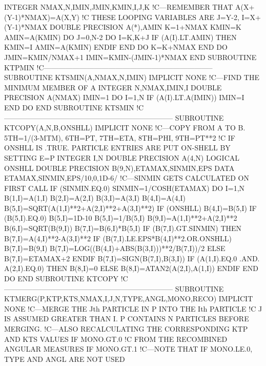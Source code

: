       INTEGER NMAX,N,IMIN,JMIN,KMIN,I,J,K
!C---REMEMBER THAT A(X+(Y-1)*NMAX)=A(X,Y)
!C   THESE LOOPING VARIABLES ARE J=Y-2, I=X+(Y-1)*NMAX
      DOUBLE PRECISION A(*),AMIN
      K=1+NMAX
      KMIN=K
      AMIN=A(KMIN)
      DO J=0,N-2
         DO I=K,K+J
            IF (A(I).LT.AMIN) THEN
               KMIN=I
               AMIN=A(KMIN)
            ENDIF
         END DO
         K=K+NMAX
      END DO
      JMIN=KMIN/NMAX+1
      IMIN=KMIN-(JMIN-1)*NMAX
    END SUBROUTINE KTPMIN
!C-----------------------------------------------------------------------
    SUBROUTINE KTSMIN(A,NMAX,N,IMIN)
      IMPLICIT NONE
!C---FIND THE MINIMUM MEMBER OF A
      INTEGER N,NMAX,IMIN,I
      DOUBLE PRECISION A(NMAX)
      IMIN=1
      DO I=1,N
         IF (A(I).LT.A(IMIN)) IMIN=I
      END DO
    END SUBROUTINE KTSMIN
!C-----------------------------------------------------------------------
    SUBROUTINE KTCOPY(A,N,B,ONSHLL)
      IMPLICIT NONE
!C---COPY FROM A TO B. 5TH=1/(3-MTM), 6TH=PT, 7TH=ETA, 8TH=PHI, 9TH=PT**2
!C   IF ONSHLL IS .TRUE. PARTICLE ENTRIES ARE PUT ON-SHELL BY SETTING E=P
      INTEGER I,N
      DOUBLE PRECISION A(4,N)
      LOGICAL ONSHLL
      DOUBLE PRECISION B(9,N),ETAMAX,SINMIN,EPS
      DATA ETAMAX,SINMIN,EPS/10,0,1D-6/
!C---SINMIN GETS CALCULATED ON FIRST CALL
      IF (SINMIN.EQ.0) SINMIN=1/COSH(ETAMAX)
      DO I=1,N
         B(1,I)=A(1,I)
         B(2,I)=A(2,I)
         B(3,I)=A(3,I)
         B(4,I)=A(4,I)
         B(5,I)=SQRT(A(1,I)**2+A(2,I)**2+A(3,I)**2)
         IF (ONSHLL) B(4,I)=B(5,I)
         IF (B(5,I).EQ.0) B(5,I)=1D-10
         B(5,I)=1/B(5,I)
         B(9,I)=A(1,I)**2+A(2,I)**2
         B(6,I)=SQRT(B(9,I))
         B(7,I)=B(6,I)*B(5,I)
         IF (B(7,I).GT.SINMIN) THEN
            B(7,I)=A(4,I)**2-A(3,I)**2
            IF (B(7,I).LE.EPS*B(4,I)**2.OR.ONSHLL) B(7,I)=B(9,I)
            B(7,I)=LOG((B(4,I)+ABS(B(3,I)))**2/B(7,I))/2
         ELSE
            B(7,I)=ETAMAX+2
         ENDIF
         B(7,I)=SIGN(B(7,I),B(3,I))
         IF (A(1,I).EQ.0 .AND. A(2,I).EQ.0) THEN
            B(8,I)=0
         ELSE
            B(8,I)=ATAN2(A(2,I),A(1,I))
         ENDIF
      END DO
    END SUBROUTINE KTCOPY
!C-----------------------------------------------------------------------
    SUBROUTINE KTMERG(P,KTP,KTS,NMAX,I,J,N,TYPE,ANGL,MONO,RECO)
      IMPLICIT NONE
!C---MERGE THE Jth PARTICLE IN P INTO THE Ith PARTICLE
!C   J IS ASSUMED GREATER THAN I. P CONTAINS N PARTICLES BEFORE MERGING.
!C---ALSO RECALCULATING THE CORRESPONDING KTP AND KTS VALUES IF MONO.GT.0
!C   FROM THE RECOMBINED ANGULAR MEASURES IF MONO.GT.1
!C---NOTE THAT IF MONO.LE.0, TYPE AND ANGL ARE NOT USED
